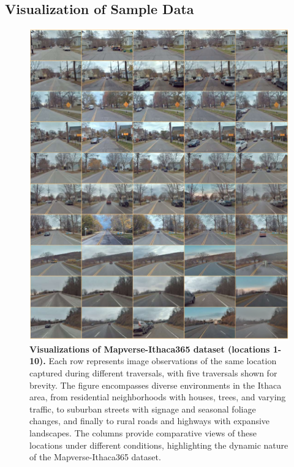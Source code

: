 \subsection{Visualization of Sample Data}

\begin{figure}[ht]
    \centering
    \includegraphics[width=0.95\linewidth]{figs_compressed/ithaca-1_compressed.pdf}
    \caption{\textbf{Visualizations of Mapverse-Ithaca365 dataset (locations 1-10).} Each row represents image observations of the same location captured during different traversals, with five traversals shown for brevity. The figure encompasses diverse environments in the Ithaca area, from residential neighborhoods with houses, trees, and varying traffic, to suburban streets with signage and seasonal foliage changes, and finally to rural roads and highways with expansive landscapes. The columns provide comparative views of these locations under different conditions, highlighting the dynamic nature of the Mapverse-Ithaca365 dataset.}
    \label{fig:ithaca-1}
\end{figure}

